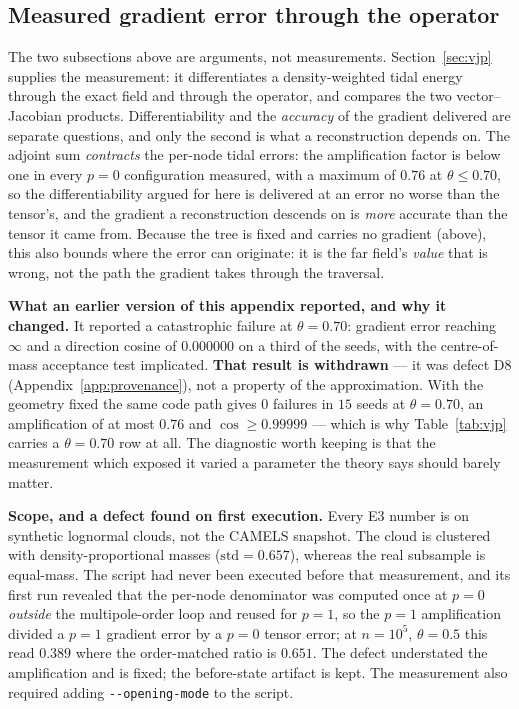 \subsection{Measured gradient error through the operator}
The two subsections above are arguments, not measurements. Section~\ref{sec:vjp} supplies the
measurement: it differentiates a density-weighted tidal energy through the exact field and through
the operator, and compares the two vector--Jacobian products. Differentiability and the
\emph{accuracy} of the gradient delivered are separate questions, and only the second is what a
reconstruction depends on. The adjoint sum \emph{contracts} the per-node tidal errors: the
amplification factor is below one in every $p{=}0$ configuration measured, with a maximum of $0.76$ at
$\theta\le0.70$, so the differentiability argued for here is delivered at an error no worse than the
tensor's, and the gradient a reconstruction descends on is \emph{more} accurate than the tensor it
came from. Because the tree is fixed and carries no gradient (above), this also bounds where the
error can originate: it is the far field's \emph{value} that is wrong, not the path the gradient
takes through the traversal.

\noindent\textbf{What an earlier version of this appendix reported, and why it changed.} It reported a
catastrophic failure at $\theta=0.70$: gradient error reaching $\infty$ and a direction cosine of
$0.000000$ on a third of the seeds, with the centre-of-mass acceptance test implicated.
\textbf{That result is withdrawn} --- it was defect D8 (Appendix~\ref{app:provenance}), not a property
of the approximation. With the geometry fixed the same
code path gives $0$ failures in $15$ seeds at $\theta=0.70$, an amplification of at most $0.76$ and
$\cos\ge0.99999$ --- which is why Table~\ref{tab:vjp} carries a $\theta=0.70$ row at all. The
diagnostic worth keeping is that the measurement which exposed it varied a parameter the theory says
should barely matter.

\noindent\textbf{Scope, and a defect found on first execution.} Every E3 number is on synthetic
lognormal clouds, not the CAMELS snapshot. The cloud is clustered with density-proportional masses
($\mathrm{std}=0.657$), whereas the real subsample is equal-mass. The script had never been executed
before that measurement, and its first run revealed that the per-node denominator was computed once
at $p{=}0$ \emph{outside} the multipole-order loop and reused for $p{=}1$, so the $p{=}1$
amplification divided a $p{=}1$ gradient error by a $p{=}0$ tensor error; at $n=10^{5}$,
$\theta=0.5$ this read $0.389$ where the order-matched ratio is $0.651$. The defect understated the
amplification and is fixed; the before-state artifact is kept. The measurement also required adding
\texttt{-{}-opening-mode} to the script.

